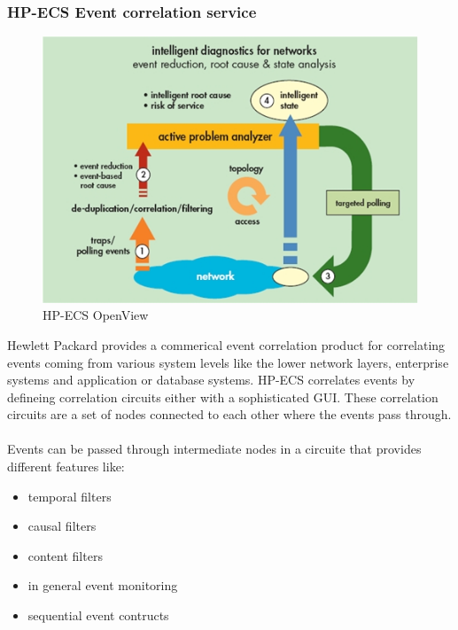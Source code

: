 \documentclass[a4paper,titlepage,11pt,DIV10,BCOR0.5cm,headinclude]{article}
\begin{document}
\subsubsection{HP-ECS Event correlation service}
\begin{figure} [ht]                
	\centering                                           
	\includegraphics[width=1\textwidth]{pics/openView.jpg}
	\caption{HP-ECS OpenView \cite{OpenViewHP}}             
	\label{fig:openViewHPECS}
\end{figure}  
Hewlett Packard provides a commerical event correlation product for correlating events coming from various system levels like the lower network layers, enterprise systems and application or database systems. HP-ECS correlates events by defineing correlation circuits either with a sophisticated GUI. These correlation circuits are a set of nodes connected to each other where the events pass through.  
\\\\
Events can be passed through intermediate nodes in a circuite that provides different features like:
\begin{itemize}
	\item temporal filters
	\item causal filters
	\item content filters
	\item in general event monitoring
	\item sequential event contructs 
\end{itemize}
\end{document}
